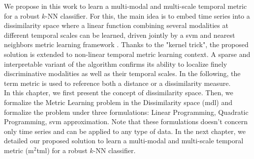 We propose in this work to learn a multi-modal and multi-scale temporal metric for a robust $k$-NN classifier. For this, the main idea is to embed time series into a dissimilarity space \cite{Pcekalska2002,Duin2012} where a linear function combining several modalities at different temporal scales can be learned, driven jointly by a {\sc svm} and nearest neighbors metric learning framework \cite{Weinberger2009a}. Thanks to the "kernel trick", the proposed solution is extended to non-linear temporal metric learning context. A sparse and interpretable variant of the algorithm confirms its ability to localize finely discriminative modalities as well as their temporal scales. In the following, the term metric is used to reference both a distance or a dissimilarity measure. \\

In this chapter, we first present the concept of dissimilarity space. Then, we formalize the Metric Learning problem in the Dissimilarity space ({\sc mdl}) and formalize the problem under three formulations: Linear Programming, Quadratic Programming, {\sc svm} approximation. Note that these formulations doesn't concern only time series and can be applied to any type of data. In the next chapter, we detailed our proposed solution to learn a multi-modal and multi-scale temporal metric ({\sc m$^2$tml}) for a robust $k$-NN classifier.


